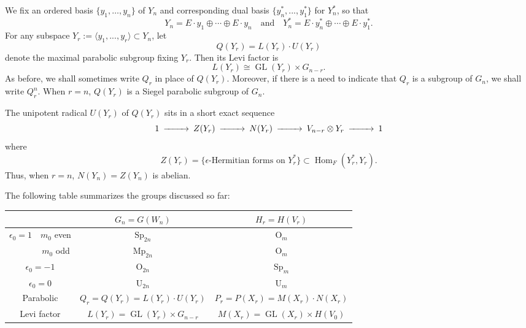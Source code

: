 \documentclass[10pt]{amsart}
\theoremstyle{plain}
\numberwithin{equation}{section}
\begin{document}
 We  fix an ordered basis $\{y_1,\dots, y_n\}$ of $Y_n$ and corresponding dual basis $\{y_n^*,..., y_1^* \}$ for $Y_n^*$, so that
\[  Y_n  =  E \cdot y_1 \oplus \cdots \oplus E \cdot y_n \quad \text{and} \quad 
Y_n^* =  E \cdot y_n^* \oplus \cdots \oplus E \cdot y_1^*. \]
For any subspace $Y_r := \langle y_1,...,y_r \rangle \subset Y_n$, let 
\[
Q(Y_r) = L(Y_r) \cdot U(Y_r)
\] 
denote the maximal parabolic subgroup fixing $Y_r$. Then its Levi factor is
\[  L(Y_r)  \cong {\operatorname{GL}}(Y_r) \times G_{n-r}. \]
 As before, we shall sometimes write $Q_r$ in place of
 $Q(Y_r)$. Moreover, if there is a need to indicate that $Q_r$ is a
 subgroup of $G_n$, we shall write $Q_r^n$. When $r = n$, $Q(Y_r)$ is
 a  Siegel parabolic subgroup of $G_n$.
 \vskip 5pt
 
 The unipotent radical $U(Y_r)$ of $Q(Y_r)$ sits in a short exact sequence
 \[  
\begin{CD}
1 @>>>  Z(Y_r) @>>> N(Y_r) @>>> V_{n-r} \otimes Y_r @>>> 1 \end{CD} 
\]
where
\[  
Z(Y_r) = \{ \text{$\epsilon$-Hermitian forms on $Y_r^*$} \} \subset
{\operatorname{Hom}}_F(Y_r^*, Y_r). 
\]
Thus, when $r=n$, $N(Y_n) = Z(Y_n)$ is abelian.
\vskip 5pt

 \vskip 5pt
The following table summarizes the groups discussed so far:
\vskip 5pt
\begin{center}
 \begin{tabular}{|c|c|c|c|}
 \hline
 \multicolumn{2}{|c|}{}&  $G_n=G(W_n)$ & $H_r=H(V_r)$ \\
 \hline
\multirow{2}{*}{$\epsilon_0 =1$}& $m_0$ even & ${\operatorname{Sp}}_{2n}$ & ${\operatorname{O}}_m$ \\
  \cline{2-4}
   & $m_0$ odd & ${\operatorname{Mp}}_{2n}$ & ${\operatorname{O}}_m$ \\
\hline
\multicolumn{2}{|c|}{$\epsilon_0=-1$}&   ${\operatorname{O}}_{2n}$ & ${\operatorname{Sp}}_m$  \\
  \hline
 \multicolumn{2}{|c|}{$\epsilon_0=0$}& ${\operatorname{U}}_{2n}$ & ${\operatorname{U}}_m$  \\
  \hline\hline
\multicolumn{2}{|c|}{Parabolic}&$Q_r=Q(Y_r)=L(Y_r)\cdot U(Y_r)$
&$P_r=P(X_r)=M(X_r)\cdot N(X_r)$\\ 
\hline
\multicolumn{2}{|c|}{Levi factor}&$L(Y_r)={\operatorname{GL}}(Y_r)\times G_{n-r}$
&$M(X_r)={\operatorname{GL}}(X_r)\times H(V_0)$\\ 
\hline
\end{tabular}
\end{center}
\end{document}
